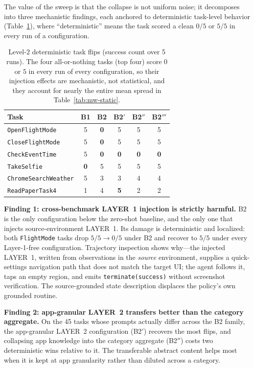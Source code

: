 The value of the sweep is that the collapse is not uniform noise; it decomposes
into three mechanistic findings, each anchored to deterministic task-level
behavior (Table~\ref{tab:mw-flips}), where ``deterministic'' means the task
scored a clean $0/5$ or $5/5$ in every run of a configuration.

\begin{table}[t]
\small
\centering
\begin{tabular}{lccccc}
\hline
\textbf{Task} & \textbf{B1} & \textbf{B2} & \textbf{B2$'$} & \textbf{B2$''$} & \textbf{B2$'''$} \\
\hline
\texttt{OpenFlightMode}          & 5 & \textbf{0} & 5 & 5 & 5 \\
\texttt{CloseFlightMode}         & 5 & \textbf{0} & 5 & 5 & 5 \\
\texttt{CheckEventTime}          & 5 & \textbf{0} & \textbf{0} & \textbf{0} & \textbf{0} \\
\texttt{TakeSelfie}              & \textbf{0} & 5 & 5 & 5 & 5 \\
\texttt{ChromeSearchWeather}     & 5 & 3 & 3 & 4 & 4 \\
\texttt{ReadPaperTask4}          & 1 & 4 & \textbf{5} & 2 & 2 \\
\hline
\end{tabular}
\caption{Level-2 deterministic task flips (success count over 5 runs). The four
all-or-nothing tasks (top four) score $0$ or $5$ in every run of every
configuration, so their injection effects are mechanistic, not statistical, and
they account for nearly the entire mean spread in Table~\ref{tab:mw-static}.}
\label{tab:mw-flips}
\end{table}

\textbf{Finding 1: cross-benchmark LAYER~1 injection is strictly harmful.} B2 is
the only configuration below the zero-shot baseline, and the only one that
injects source-environment LAYER~1. Its damage is deterministic and localized:
both \texttt{FlightMode} tasks drop $5/5\to0/5$ under B2 and recover to $5/5$
under every Layer-1-free configuration. Trajectory inspection shows why---the
injected LAYER~1, written from observations in the \emph{source} environment,
supplies a quick-settings navigation path that does not match the target UI; the
agent follows it, taps an empty region, and emits \texttt{terminate(success)}
without screenshot verification. The source-grounded state description displaces
the policy's own grounded routine.

\textbf{Finding 2: app-granular LAYER~2 transfers better than the category
aggregate.} On the 45 tasks whose prompts actually differ across the B2 family,
the app-granular LAYER~2 configuration (B2$'$) recovers the most flips, and
collapsing app knowledge into the category aggregate (B2$''$) costs two
deterministic wins relative to it. The transferable abstract content helps most
when it is kept at app granularity rather than diluted across a category.

